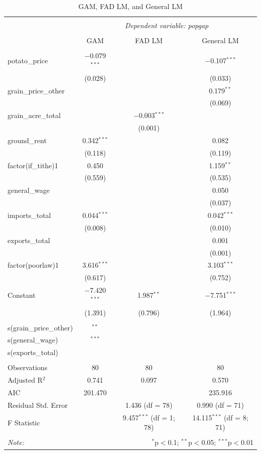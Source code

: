 \begin{table}[h]
    \centering
    \caption{GAM, FAD LM, and General LM}
    \begin{tabular}{@{\extracolsep{5pt}}lccc}
    \\[-1.8ex]\hline
    \hline \\[-1.8ex]
    & \multicolumn{3}{c}{\textit{Dependent variable: popgap}} \\
    \cline{2-4}
    \\[-1.8ex] & GAM & FAD LM & General LM \\
    \hline \\[-1.8ex]
    potato\_price & $-$0.079$^{***}$ & & $-$0.107$^{***}$ \\
     & (0.028) & & (0.033) \\
    grain\_price\_other & &  & 0.179$^{**}$ \\
     & &  & (0.069) \\
    grain\_acre\_total & & $-$0.003$^{***}$ & \\
     & & (0.001) & \\
    ground\_rent & 0.342$^{***}$ & & 0.082 \\
     & (0.118) & & (0.119) \\
    factor(if\_tithe)1 & 0.450 & & 1.159$^{**}$ \\
     & (0.559) & & (0.535) \\
    general\_wage & & & 0.050 \\
     & & & (0.037) \\
    imports\_total & 0.044$^{***}$ & & 0.042$^{***}$ \\
     & (0.008) & & (0.010) \\
    exports\_total & & & 0.001 \\
     & & & (0.001) \\
    factor(poorlaw)1 & 3.616$^{***}$ & & 3.103$^{***}$ \\
     & (0.617) & & (0.752) \\
    Constant & $-$7.420$^{***}$ & 1.987$^{**}$ & $-$7.751$^{***}$ \\
     & (1.391) & (0.796) & (1.964) \\
    \hline \\[-1.8ex]
    s(grain\_price\_other) & $^{**}$ & & \\
    s(general\_wage) & $^{***}$ & & \\
    s(exports\_total) &  & & \\
    \hline \\[-1.8ex]
    Observations & 80 & 80 & 80 \\
    Adjusted R$^{2}$ & 0.741 & 0.097 & 0.570 \\
    AIC & 201.470 & & 235.916 \\
    Residual Std. Error & & 1.436 (df = 78) & 0.990 (df = 71) \\
    F Statistic & & 9.457$^{***}$ (df = 1; 78) & 14.115$^{***}$ (df = 8; 71) \\
    \hline
    \hline \\[-1.8ex]
    \textit{Note:}  & \multicolumn{3}{r}{$^{*}$p$<$0.1; $^{**}$p$<$0.05; $^{***}$p$<$0.01} \\
    \end{tabular}
\end{table}

